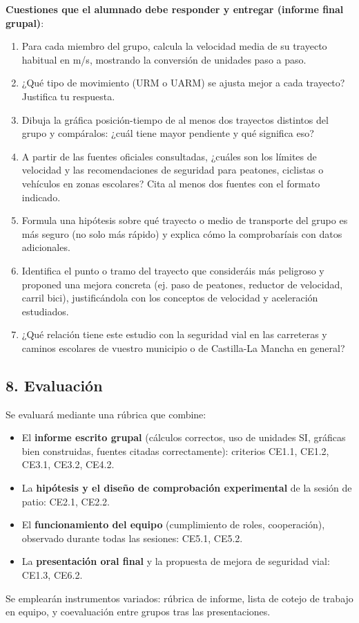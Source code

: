 \documentclass[11pt,a4paper]{article}
\begin{document}
\textbf{Cuestiones que el alumnado debe responder y entregar (informe final grupal)}:
\begin{enumerate}
    \item Para cada miembro del grupo, calcula la velocidad media de su trayecto habitual en m/s, mostrando la conversión de unidades paso a paso.
    \item ¿Qué tipo de movimiento (URM o UARM) se ajusta mejor a cada trayecto? Justifica tu respuesta.
    \item Dibuja la gráfica posición-tiempo de al menos dos trayectos distintos del grupo y compáralos: ¿cuál tiene mayor pendiente y qué significa eso?
    \item A partir de las fuentes oficiales consultadas, ¿cuáles son los límites de velocidad y las recomendaciones de seguridad para peatones, ciclistas o vehículos en zonas escolares? Cita al menos dos fuentes con el formato indicado.
    \item Formula una hipótesis sobre qué trayecto o medio de transporte del grupo es más seguro (no solo más rápido) y explica cómo la comprobaríais con datos adicionales.
    \item Identifica el punto o tramo del trayecto que consideráis más peligroso y proponed una mejora concreta (ej. paso de peatones, reductor de velocidad, carril bici), justificándola con los conceptos de velocidad y aceleración estudiados.
    \item ¿Qué relación tiene este estudio con la seguridad vial en las carreteras y caminos escolares de vuestro municipio o de Castilla-La Mancha en general?
\end{enumerate}

\subsection*{8. Evaluación}
Se evaluará mediante una rúbrica que combine:
\begin{itemize}
    \item El \textbf{informe escrito grupal} (cálculos correctos, uso de unidades SI, gráficas bien construidas, fuentes citadas correctamente): criterios CE1.1, CE1.2, CE3.1, CE3.2, CE4.2.
    \item La \textbf{hipótesis y el diseño de comprobación experimental} de la sesión de patio: CE2.1, CE2.2.
    \item El \textbf{funcionamiento del equipo} (cumplimiento de roles, cooperación), observado durante todas las sesiones: CE5.1, CE5.2.
    \item La \textbf{presentación oral final} y la propuesta de mejora de seguridad vial: CE1.3, CE6.2.
\end{itemize}
Se emplearán instrumentos variados: rúbrica de informe, lista de cotejo de trabajo en equipo, y coevaluación entre grupos tras las presentaciones.
\end{document}
